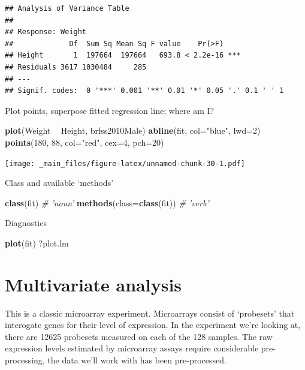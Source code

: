\documentclass[]{article}
\newenvironment{Shaded}{\begin{snugshade}}{\end{snugshade}}
\newcommand{\KeywordTok}[1]{\textcolor[rgb]{0.13,0.29,0.53}{\textbf{#1}}}
\newcommand{\DataTypeTok}[1]{\textcolor[rgb]{0.13,0.29,0.53}{#1}}
\newcommand{\DecValTok}[1]{\textcolor[rgb]{0.00,0.00,0.81}{#1}}
\newcommand{\StringTok}[1]{\textcolor[rgb]{0.31,0.60,0.02}{#1}}
\newcommand{\CommentTok}[1]{\textcolor[rgb]{0.56,0.35,0.01}{\textit{#1}}}
\newcommand{\OperatorTok}[1]{\textcolor[rgb]{0.81,0.36,0.00}{\textbf{#1}}}
\newcommand{\NormalTok}[1]{#1}
\theoremstyle{definition}
\theoremstyle{definition}
\theoremstyle{remark}
\begin{document}
\begin{verbatim}
## Analysis of Variance Table
## 
## Response: Weight
##             Df  Sum Sq Mean Sq F value    Pr(>F)    
## Height       1  197664  197664   693.8 < 2.2e-16 ***
## Residuals 3617 1030484     285                      
## ---
## Signif. codes:  0 '***' 0.001 '**' 0.01 '*' 0.05 '.' 0.1 ' ' 1
\end{verbatim}

Plot points, superpose fitted regression line; where am I?

\begin{Shaded}
\begin{Highlighting}[]
\KeywordTok{plot}\NormalTok{(Weight }\OperatorTok{~}\StringTok{ }\NormalTok{Height, brfss2010Male)}
\KeywordTok{abline}\NormalTok{(fit, }\DataTypeTok{col=}\StringTok{"blue"}\NormalTok{, }\DataTypeTok{lwd=}\DecValTok{2}\NormalTok{)}
\KeywordTok{points}\NormalTok{(}\DecValTok{180}\NormalTok{, }\DecValTok{88}\NormalTok{, }\DataTypeTok{col=}\StringTok{"red"}\NormalTok{, }\DataTypeTok{cex=}\DecValTok{4}\NormalTok{, }\DataTypeTok{pch=}\DecValTok{20}\NormalTok{)}
\end{Highlighting}
\end{Shaded}

\texttt{[image: \_main\_files/figure-latex/unnamed-chunk-30-1.pdf]}

Class and available `methods'

\begin{Shaded}
\begin{Highlighting}[]
\KeywordTok{class}\NormalTok{(fit)                 }\CommentTok{# 'noun'}
\KeywordTok{methods}\NormalTok{(}\DataTypeTok{class=}\KeywordTok{class}\NormalTok{(fit))  }\CommentTok{# 'verb'}
\end{Highlighting}
\end{Shaded}

Diagnostics

\begin{Shaded}
\begin{Highlighting}[]
\KeywordTok{plot}\NormalTok{(fit)}
\NormalTok{?plot.lm}
\end{Highlighting}
\end{Shaded}

\section{Multivariate analysis}\label{multivariate-analysis}

This is a classic microarray experiment. Microarrays consist of
`probesets' that interogate genes for their level of expression. In the
experiment we're looking at, there are 12625 probesets measured on each
of the 128 samples. The raw expression levels estimated by microarray
assays require considerable pre-processing, the data we'll work with has
been pre-processed.
\end{document}
